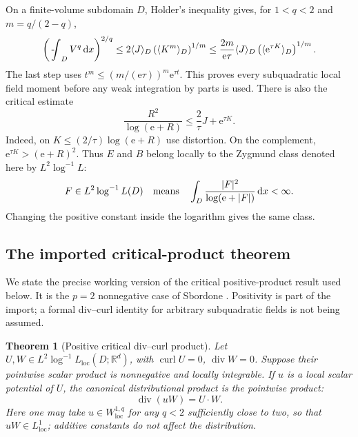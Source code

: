 \documentclass[11pt,a4paper]{article}
\numberwithin{equation}{section}
\newtheorem{theorem}{Theorem}[section]
\theoremstyle{definition}
\theoremstyle{remark}\newtheorem{remark}[theorem]{Remark}
\DeclareMathOperator{\diver}{div}
\DeclareMathOperator{\curl}{curl}
\newcommand{\R}{\mathbb R}
\newcommand{\ee}{\mathrm e}
\newcommand{\dd}{\,\mathrm dx}
\newcommand{\mean}[2]{\langle #1\rangle_{#2}}
\newcommand{\loc}{\mathrm{loc}}
\newcommand{\fint}{\mathop{\rlap{\kern.18em-}\int}\nolimits}
\begin{document}
On a finite-volume subdomain \(D\), Holder's inequality gives, for \(1<q<2\)
and \(m=q/(2-q)\),
\begin{equation}\label{eq:initial-q}
 \left(\fint_DV^q\dd\right)^{2/q}
 \leq2\mean JD\left(\mean{K^m}D\right)^{1/m}
 \leq\frac{2m}{\ee\tau}\mean JD
                     \left(\mean{\ee^{\tau K}}D\right)^{1/m}.
\end{equation}
The last step uses
\(t^m\leq(m/(\ee\tau))^m\ee^{\tau t}\).
This proves every subquadratic local field moment before any weak
integration by parts is used.
There is also the critical estimate
\begin{equation}\label{eq:critical-start}
 \frac{R^2}{\log(\ee+R)}
 \leq\frac2\tau J+\ee^{\tau K}.
\end{equation}
Indeed, on \(K\leq(2/\tau)\log(\ee+R)\) use distortion.
On the complement, \(\ee^{\tau K}>(\ee+R)^2\).
Thus \(E\) and \(B\) belong locally to the Zygmund class denoted here by
\(L^2\log^{-1}L\):
\[
 F\in L^2\log^{-1}L(D)
 \quad\hbox{means}\quad
 \int_D\frac{|F|^2}{\log(\ee+|F|)}\dd<\infty.
\]
Changing the positive constant inside the logarithm gives the same class.

\subsection{The imported critical-product theorem}

We state the precise working version of the critical positive-product
result used below. It is the \(p=2\) nonnegative case of
Sbordone \cite[Corollary~3.3 and the following discussion,
p.~745]{Sbordone1997}. Positivity is part of the import; a formal
div--curl identity for arbitrary subquadratic fields is not being assumed.

\begin{theorem}[Positive critical div--curl product]\label{thm:critical-product}
Let \(U,W\in L^2\log^{-1}L_{\loc}(D;\R^d)\), with
\(\curl U=0\), \(\diver W=0\). Suppose their pointwise scalar product
is nonnegative and locally integrable. If \(u\) is a local scalar
potential of \(U\), the canonical distributional product is the
pointwise product:
\begin{equation}\label{eq:critical-product}
 \diver(uW)=U\cdot W.
\end{equation}
Here one may take \(u\in W^{1,q}_{\loc}\) for any \(q<2\) sufficiently
close to two, so that \(uW\in L^1_{\loc}\); additive constants do not
affect the distribution.
\end{theorem}
\end{document}
